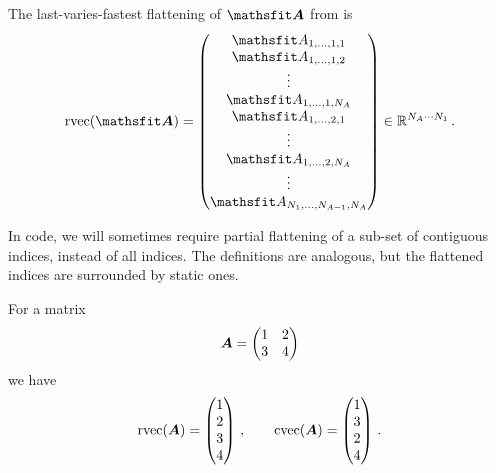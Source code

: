 \begin{definition}\label{def:rvec}
  The last-varies-fastest flattening of $\tA$ from  is
  \begin{align*}
    \rvec(\tA) =
    \begin{pmatrix}
      \etA_{1,\dots,1,1}   \\
      \etA_{1,\dots,1,2}   \\
      \vdots               \\
      \etA_{1,\dots,1,N_A} \\
      \etA_{1,\dots,2,1}   \\
      \vdots               \\
      \etA_{1,\dots,2,N_A} \\
      \vdots               \\
      \etA_{N_1,\dots,N_{A-1},N_A}
    \end{pmatrix}
    \in \sR ^{N_A \cdots N_1}\,.
  \end{align*}
\end{definition}

In code, we will sometimes require partial flattening of a sub-set of contiguous indices, instead of all indices.
The definitions are analogous, but the flattened indices are surrounded by static ones.

\begin{example}\label{ex:flattening}
  For a matrix
  \begin{equation*}
    {\bm{A}} = \begin{pmatrix} 1 & 2 \\ 3 & 4 \end{pmatrix}
  \end{equation*}
  we have
  \begin{equation*}
    \operatorname{rvec}({\bm{A}})
    =
    \begin{pmatrix}
      1 \\ 2 \\ 3 \\ 4
    \end{pmatrix}\,,
    \qquad
    \operatorname{cvec}({\bm{A}})
    =
    \begin{pmatrix}
      1 \\ 3 \\ 2 \\ 4
    \end{pmatrix}\,.
  \end{equation*}
\end{example}
